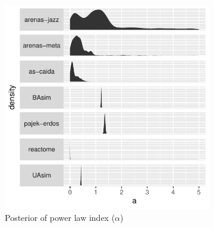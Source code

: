 \documentclass[
  10pt,
  a4paper,
]{scrreprt}
\theoremstyle{plain}
\theoremstyle{plain}
\theoremstyle{definition}
\theoremstyle{plain}
\theoremstyle{remark}
\begin{document}
{\begin{figure}[H]
\end{figure}

\begin{figure}

\begin{minipage}[t]{0.50\linewidth}

{\centering 

\begin{figure}[H]

{\centering \includegraphics[width=1\textwidth,height=\textheight]{doc_files/figure-pdf/fig-alpha-1.pdf}

}

\caption{\label{fig-alpha}Posterior of power law index (\(\alpha\))}

\end{figure}

}

\end{minipage}%
%
\begin{minipage}[t]{0.50\linewidth}

{\centering 

\begin{figure}[H]


\end{figure}}
\end{minipage}
\end{figure}}
\end{document}
